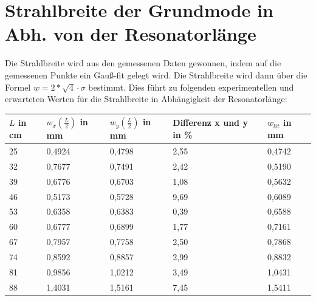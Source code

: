 \documentclass[bigchapter,colorback,accentcolor=tud4b,linedtoc,11pt]{tudreport}
\numberwithin{equation}{subsection}
\begin{document}
\section{Strahlbreite der Grundmode in Abh. von der Resonatorlänge}
Die Strahlbreite wird aus den gemessenen Daten gewonnen, indem auf die gemessenen Punkte ein Gauß-fit gelegt wird. Die Strahlbreite wird dann über die Formel
$w=2*\sqrt{4}\cdot\sigma$
bestimmt. Dies führt zu folgenden experimentellen und erwarteten Werten für die Strahlbreite in Abhängigkeit der Resonatorlänge:
\begin{center}
    \begin{tabular}{ | l | l | l | l | p{4cm} |}
    \hline
    $L$ in cm & $w_x\left(\frac{L}{2}\right)$ in mm & $w_y\left(\frac{L}{2}\right)$ in mm & Differenz x und y in \% & $w_{lit}$ in mm \\ \hline
    25 & 0,4924 & 0,4798 & 2,55 & 0,4742 \\ \hline
    32 & 0,7677 & 0,7491 & 2,42 & 0,5190 \\ \hline
    39 & 0,6776 & 0,6703 & 1,08 & 0,5632 \\ \hline
    46 & 0,5173 & 0,5728 & 9,69 & 0,6089 \\ \hline
    53 & 0,6358 & 0,6383 & 0,39 & 0,6588 \\ \hline
    60 & 0,6777 & 0,6899 & 1,77 & 0,7161 \\ \hline
    67 & 0,7957 & 0,7758 & 2,50 & 0,7868 \\ \hline
    74 & 0,8592 & 0,8857 & 2,99 & 0,8832 \\ \hline
    81 & 0,9856 & 1,0212 & 3,49 & 1,0431 \\ \hline
    88 & 1,4031 & 1,5161 & 7,45 & 1,5411 \\ \hline
    \end{tabular}
\end{center}
\end{document}
